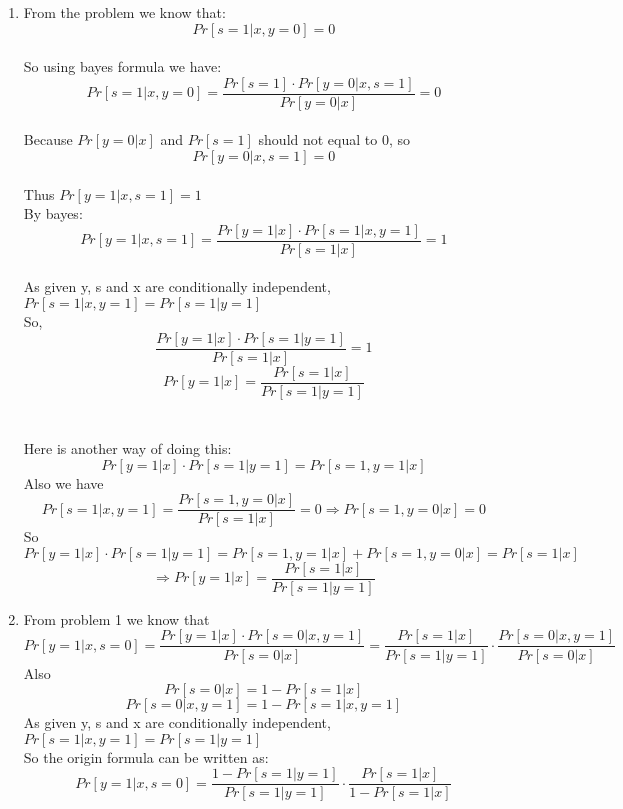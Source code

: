 \documentclass[12pt]{article}
\begin{document}
\begin{enumerate}
	\item 
	From the problem we know that:\\
	$$Pr[s=1|x, y=0]=0$$\\
	So using bayes formula we have:\\
	$$Pr[s=1|x, y=0]=\frac{Pr[s=1]\cdot Pr[y=0|x,s=1]}{Pr[y=0|x]}=0$$\\
	Because $Pr[y=0|x]$ and $Pr[s=1]$ should not equal to 0, so \\
	$$Pr[y=0|x,s=1]=0$$\\
	Thus $Pr[y=1|x,s=1]=1$\\
	By bayes:
	$$Pr[y=1|x,s=1]=\frac{Pr[y=1|x]\cdot Pr[s=1|x,y=1]}{Pr[s=1|x]}=1$$\\
	As given y, s and x are conditionally independent, $Pr[s=1|x,y=1]=Pr[s=1|y=1]$\\
	So, \\
	$$\frac{Pr[y=1|x]\cdot Pr[s=1|y=1]}{Pr[s=1|x]}=1$$
	$$Pr[y=1|x]=\frac{Pr[s=1|x]}{Pr[s=1|y=1]}$$
	\\
	\\
	Here is another way of doing this:\\
	$$Pr[y=1|x]\cdot Pr[s=1|y=1]=Pr[s=1,y=1|x]$$
	Also we have 
	$$Pr[s=1|x,y=1]=\frac{Pr[s=1,y=0|x]}{Pr[s=1|x]}=0\Rightarrow Pr[s=1,y=0|x]=0$$
	So
	$$Pr[y=1|x]\cdot Pr[s=1|y=1]=Pr[s=1,y=1|x]+Pr[s=1,y=0|x]=Pr[s=1|x]$$
	$$\Rightarrow Pr[y=1|x]=\frac{Pr[s=1|x]}{Pr[s=1|y=1]}$$
	
	
	\item
	From problem 1 we know that\\
	$$Pr[y=1|x,s=0]=\frac{Pr[y=1|x]\cdot Pr[s=0|x,y=1]}{Pr[s=0|x]}=\frac{Pr[s=1|x]}{Pr[s=1|y=1]}\cdot \frac{Pr[s=0|x,y=1]}{Pr[s=0|x]}$$
	Also \\
	$$Pr[s=0|x]=1-Pr[s=1|x]$$
	$$Pr[s=0|x,y=1]=1-Pr[s=1|x,y=1]$$
	As given y, s and x are conditionally independent, $Pr[s=1|x,y=1]=Pr[s=1|y=1]$\\
	So the origin formula can be written as:\\
	$$Pr[y=1|x,s=0]=\frac{1-Pr[s=1|y=1]}{Pr[s=1|y=1]}\cdot \frac{Pr[s=1|x]}{1-Pr[s=1|x]}$$
	

\end{enumerate}
\end{document}
